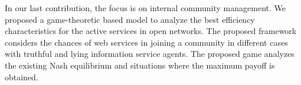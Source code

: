 In our last contribution, the focus is on internal community management. We proposed a game-theoretic based model to analyze the best efficiency characteristics for the active services in open networks. The proposed framework considers the chances of web services in joining a community in different cases with truthful and lying information service agents. The proposed game analyzes the existing Nash equilibrium and situations where the maximum payoff is obtained.
